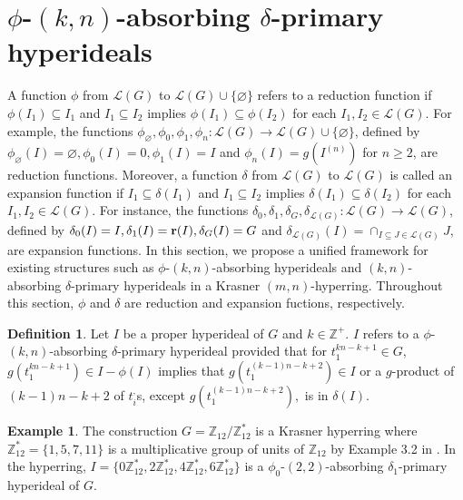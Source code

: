 \documentclass[preprint,review,10pt]{amsart}
\theoremstyle{definition}
\newtheorem{definition}[theorem]{Definition}
\newtheorem{example}[theorem]{Example}
\theoremstyle{remark}
\numberwithin{equation}{section}
\begin{document}
\section{$\phi$-$(k,n)$-absorbing $\delta$-primary hyperideals}
A function $\phi$ from $\mathcal{L}(G)$ to $\mathcal{L}(G) \cup \{\varnothing\}$ refers to a reduction function if  $\phi(I_1) \subseteq I_1$ and $I_1 \subseteq I_2$ implies $\phi(I_1) \subseteq \phi(I_2)$ for each $I_1,I_2 \in \mathcal{L}(G)$. For example, the functions $\phi_{\varnothing}, \phi_0, \phi_1,  \phi_n: \mathcal{L}(G) \longrightarrow \mathcal{L}(G) \cup \{\varnothing\}$, defined by $\phi_{\varnothing}(I)=\varnothing, \phi_0(I)=0,\phi_1(I)=I$ and $\phi_n(I)=g(I^{(n)})$ for $n \geq 2$, are reduction functions. Moreover, a function $\delta$ from $\mathcal{L}(G)$ to $\mathcal{L}(G)$ is called  an expansion  function if  $I_1  \subseteq \delta(I_1)$ and $I_1 \subseteq I_2$ implies $\delta(I_1) \subseteq \delta(I_2)$ for each $I_1,I_2 \in \mathcal{L}(G)$. For instance, the functions $\delta_0, \delta_1, \delta_G,\delta_{\mathcal{L}(G)}: \mathcal{L}(G) \longrightarrow \mathcal{L}(G)$, defined by $\delta_0(I)=I, \delta_1(I)={\bf r}(I),\delta_G(I)=G$ and $\delta_{\mathcal{L}(G) }(I)=\cap_{I \subseteq J \in \mathcal{L}(G) }J$, are expansion  functions. In this section, we propose a unified framework for existing structures such as $\phi$-$(k,n)$-absorbing  hyperideals and $(k,n)$-absorbing $\delta$-primary hyperideals in a Krasner $(m,n)$-hyperring.   Throughout this section,  $\phi$ and $\delta$ are reduction and expansion fuctions, respectively.
\begin{definition}
Let $I$  be a proper hyperideal of $G$ and $k \in \mathbb{Z}^+$. $I$ refers to a  $\phi$-$(k,n)$-absorbing $\delta$-primary hyperideal provided that for $t_1^{kn-k+1} \in G$,  $g(t_1^{kn-k+1}) \in I-\phi(I)$ implies  that  $g(t_1^{(k-1)n-k+2}) \in I$ or a $g$-product  of $(k-1)n-k+2$ of  $t_i^,$s, except $g(t_1^{(k-1)n-k+2}),$ is in $\delta(I)$.
\end{definition} 
\begin{example} \label{hanieh} 
The construction $G=\mathbb{Z}_{12}/\mathbb{Z}_{12}^*$ is a Krasner hyperring where $\mathbb{Z}_{12}^*=\{1,5,7,11\}$ is a multiplicative
group of units of $\mathbb{Z}_{12}$ by Example 3.2 in \cite{rev2}. In the hyperring,   $I=\{0\mathbb{Z}_{12}^*,2\mathbb{Z}_{12}^*,4\mathbb{Z}_{12}^*, 6\mathbb{Z}_{12}^*\}$ is a $\phi_0$-$(2,2)$-absorbing $\delta_1$-primary hyperideal of $G$. 
\end{example}
\end{document}
